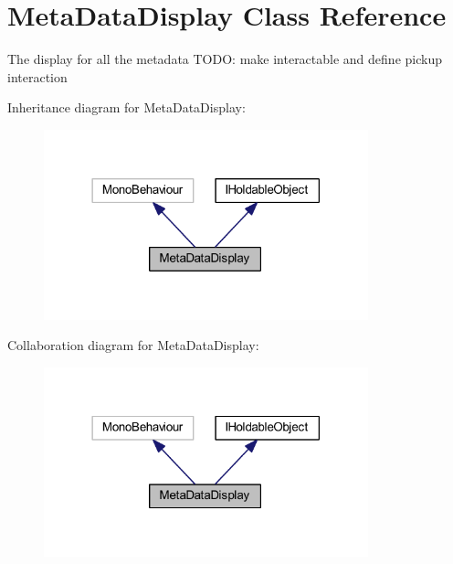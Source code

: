 \hypertarget{class_meta_data_display}{}\section{Meta\+Data\+Display Class Reference}
\label{class_meta_data_display}


The display for all the metadata T\+O\+DO\+: make interactable and define pickup interaction  




Inheritance diagram for Meta\+Data\+Display\+:
\nopagebreak
\begin{figure}[H]
\begin{center}
\leavevmode
\includegraphics[width=266pt]{class_meta_data_display__inherit__graph}
\end{center}
\end{figure}


Collaboration diagram for Meta\+Data\+Display\+:
\nopagebreak
\begin{figure}[H]
\begin{center}
\leavevmode
\includegraphics[width=266pt]{class_meta_data_display__coll__graph}
\end{center}
\end{figure}
